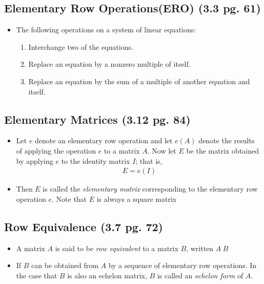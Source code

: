 \documentclass[hidelinks, 11pt, openleft]{scrartcl}
\begin{document}
\subsection*{Elementary Row Operations(ERO) (3.3 pg. 61) }
\begin{itemize}
    \item The following operations on a system of linear equations:
        \begin{enumerate}
            \item Interchange two of the equations.
            \item Replace an equation by a nonzero multiple of itself.
            \item Replace an equation by the sum of a multiple of another equation and itself.
        \end{enumerate}
\end{itemize}

\subsection*{Elementary Matrices (3.12 pg. 84)}
\begin{itemize}
    \item Let $e$ denote an elementary row operation and let $e(A)$ denote the results of applying the operation $e$ to a matrix $A$. Now let $E$ be the matrix obtained by applying $e$ to the identity matrix $I$; that is,
    \begin{align*}
        E=e(I)
    \end{align*}
    \item Then $E$ is called the \textit{elementary matrix} corresponding to the elementary row operation $e$. Note that $E$ is always a square matrix
\end{itemize}

\subsection*{Row Equivalence (3.7 pg. 72)}
\begin{itemize}
    \item A matrix $A$ is said to be \textit{row equivalent} to a matrix $B$, written $A~B$
    \item If $B$ can be obtained from $A$ by a sequence of elementary row operations. In the case that $B$ is also an echelon matrix, $B$ is called an \textit{echelon form} of $A$.
\end{itemize}
\end{document}
